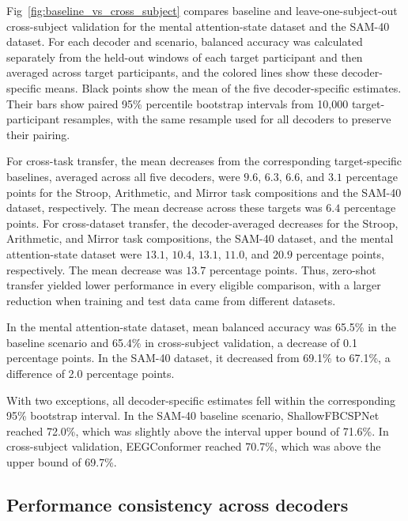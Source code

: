 \documentclass[10pt,letterpaper]{article}
\begin{document}
Fig~\ref{fig:baseline_vs_cross_subject} compares baseline and
leave-one-subject-out cross-subject validation for the mental attention-state
dataset and the SAM-40 dataset. For each decoder and scenario, balanced accuracy was
calculated separately from the held-out windows of each target participant and
then averaged across target participants, and the colored lines show these
decoder-specific means. Black points show the mean of the five decoder-specific
estimates. Their bars show paired 95\% percentile bootstrap intervals from
10,000 target-participant resamples, with the same resample used for all
decoders to preserve their pairing.



For cross-task transfer, the mean decreases from the corresponding
target-specific baselines, averaged across all five decoders, were $9.6$,
$6.3$, $6.6$, and $3.1$ percentage points for the Stroop, Arithmetic, and
Mirror task compositions and the SAM-40 dataset, respectively. The mean
decrease across these targets was $6.4$ percentage points. For cross-dataset
transfer, the decoder-averaged decreases for the Stroop, Arithmetic, and Mirror
task compositions, the SAM-40 dataset, and the mental attention-state dataset
were $13.1$, $10.4$, $13.1$, $11.0$, and $20.9$ percentage points,
respectively. The mean decrease was $13.7$ percentage points. Thus, zero-shot
transfer yielded lower performance in every eligible comparison, with a larger
reduction when training and test data came from
different datasets.



In the mental attention-state dataset, mean balanced accuracy was 65.5\% in the
baseline scenario and 65.4\% in cross-subject validation, a decrease of 0.1
percentage points. In the SAM-40 dataset, it decreased from 69.1\% to 67.1\%,
a difference of 2.0 percentage points.

With two exceptions, all decoder-specific estimates fell within the
corresponding 95\% bootstrap interval. In the SAM-40 baseline scenario,
ShallowFBCSPNet reached 72.0\%, which was slightly above the interval upper
bound of 71.6\%. In cross-subject validation, EEGConformer reached 70.7\%,
which was above the upper bound of 69.7\%.

\subsection*{Performance consistency across decoders}
\end{document}
